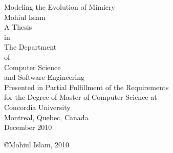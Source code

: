 \begin{titlepage}
\begin{center}

\Large Modeling the Evolution of Mimicry\\[1.5cm]
\large Mohiul Islam\\[2.5cm]
\large A Thesis\\ in\\ The Department\\ of\\ Computer Science\\ and Software Engineering\\[2.5cm]
\large Presented in Partial Fulfillment of the Requirements\\ for the Degree of Master of Computer Science at\\ Concordia University\\ Montreal, Quebec, Canada\\[1.5cm]
\large December 2010\\[2cm]

\vfill

\large \copyright Mohiul Islam, 2010
\end{center}
\end{titlepage}
